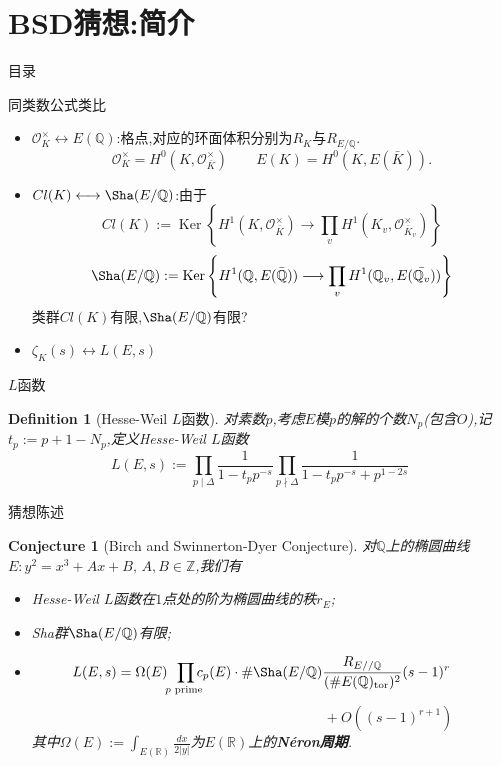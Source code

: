 \documentclass[pdf]{beamer}
\numberwithin{equation}{section}
\theoremstyle{plain}
\newtheorem{defn}[theorem]{Definition}
\theoremstyle{plain}
\theoremstyle{plain}
\newtheorem{conj}[theorem]{Conjecture}
\theoremstyle{remark}
\DeclareMathOperator{\Ker}{\operatorname{Ker}}
\DeclareMathOperator{\tor}{\operatorname{tor}}
\begin{document}
\section{BSD猜想:简介}
\begin{frame}{目录}
\tableofcontents[currentsection]
\end{frame}
\begin{frame}[fragile]{同类数公式类比}
\begin{itemize}
	\item $\mathcal{O}_K^{\times} \longleftrightarrow E(\mathbb{Q})$:格点,对应的环面体积分别为$R_K$与$R_{E/\mathbb{Q}}$.
	$$\mathcal{O}_K^{\times}=H^0(K,\mathcal{O}_{\bar{K}}^{\times}) \qquad E(K)=H^0(K,E(\bar{K})).$$
	\item $Cl(K) \longleftrightarrow \Sha (E/\mathbb{Q})$:由于
	$$Cl(K):=\Ker \left\{H^1(K,\mathcal{O}_{\bar{K}}^{\times}) \longrightarrow \prod_{v}H^1(K_v,\mathcal{O}_{\bar{K}_v}^{\times}) \right\}$$
	$$\Sha(E/\mathbb{Q}):=\Ker \left\{H^1(\mathbb{Q},E(\bar{\mathbb{Q}})) \longrightarrow \prod_{v}H^1(\mathbb{Q}_v,E(\bar{\mathbb{Q}_v})) \right\}$$
	类群$Cl(K)$有限,$\Sha (E/\mathbb{Q})$有限?
	\item $\zeta_K(s) \longleftrightarrow L(E,s)$
\end{itemize}
\end{frame}
\begin{frame}[fragile]{$L$函数}
\begin{defn}[Hesse-Weil $L$函数]
	\hspace*{20pt}对素数$p$,考虑$E$模$p$的解的个数$N_p$(包含$O$),记$t_p:=p+1-N_p$,定义Hesse-Weil $L$函数
	$$L(E,s):=\prod_{p \mid \Delta} \frac{1}{1-t_pp^{-s}} \prod_{p \nmid \Delta} \frac{1}{1-t_pp^{-s}+p^{1-2s}}$$
\end{defn}
\end{frame}
\begin{frame}[fragile]{猜想陈述}
\begin{conj}[Birch and Swinnerton-Dyer Conjecture]
	\hspace*{20pt}对$\mathbb{Q}$上的椭圆曲线$E:y^2=x^3+Ax+B,\, A,B \in \mathbb{Z}$,我们有
	\begin{itemize}
		\item Hesse-Weil $L$函数在$1$点处的阶为椭圆曲线的秩$r_E$;
		\item Sha群$\Sha(E/\mathbb{Q})$有限;
		\item $$\hspace{-0.5cm}L(E,s)=\Omega(E)\!\! \prod_{p \text{ prime }}\hspace{-3mm}c_p(E)\cdot \#\Sha(E/\mathbb{Q})\frac{R_{E//\mathbb{Q}}}{(\#E(\mathbb{Q})_{\tor})^2} (s-1)^r$$
		$$\hspace{7cm}+O((s-1)^{r+1})$$
		其中$\Omega(E):=\int_{E(\mathbb{R})} \frac{dx}{2|y|}$为$E(\mathbb{R})$上的\textbf{N\'{e}ron周期}.
	\end{itemize}
\end{conj}
\end{frame}
\end{document}
